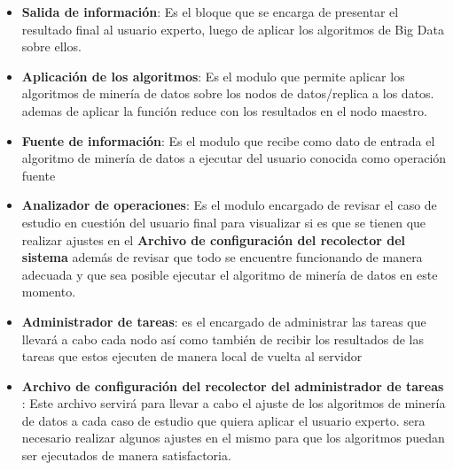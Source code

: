 \begin{itemize}
	\item \textbf{Salida de información}: Es el bloque que se encarga de presentar el resultado final al usuario experto, luego de aplicar los algoritmos de Big Data sobre ellos.
	\item \textbf{Aplicación de los algoritmos}: Es el modulo que permite aplicar los algoritmos de minería de datos sobre los nodos de datos/replica a los datos. ademas de aplicar la función reduce con los resultados en el nodo maestro.
	\item \textbf{Fuente de información}: Es el modulo que recibe como dato de entrada el algoritmo de minería de datos a ejecutar del usuario conocida como operación fuente
	\item \textbf{Analizador de operaciones}: Es el modulo encargado de revisar el caso de estudio en cuestión del usuario final para visualizar si es que se tienen que realizar ajustes en el \textbf{Archivo de configuración del recolector del sistema} además de revisar que todo se encuentre funcionando de manera adecuada y que sea posible ejecutar el algoritmo de minería de datos en este momento.
	\item \textbf{Administrador de tareas}: es el encargado de administrar las tareas que llevará a cabo cada nodo así como también de recibir los resultados de las tareas que estos ejecuten de manera local de vuelta al servidor
	\item \textbf{Archivo de configuración del recolector del administrador de tareas }: Este archivo servirá para llevar a cabo el ajuste de los algoritmos de minería de datos a cada caso de estudio que quiera aplicar el usuario experto. sera necesario realizar algunos ajustes en el mismo para que los algoritmos puedan ser ejecutados de manera satisfactoria.
\end{itemize}
